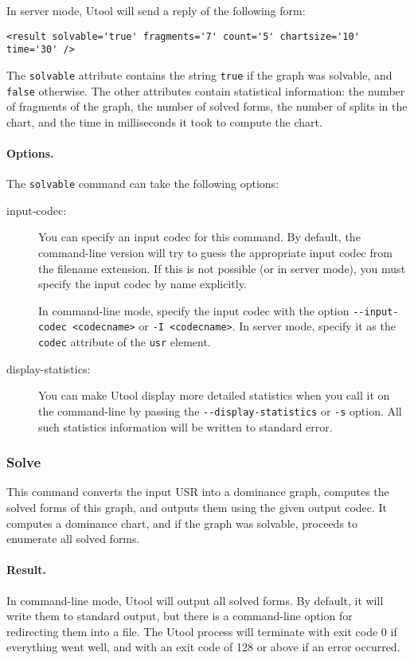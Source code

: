 In server mode, Utool will send a reply of the following form:
\begin{verbatim}
<result solvable='true' fragments='7' count='5' chartsize='10' time='30' />
\end{verbatim}

The \verb?solvable? attribute contains the string \verb?true? if the
graph was solvable, and \verb?false? otherwise. The other attributes
contain statistical information: the number of fragments of the graph,
the number of solved forms, the number of splits in the chart, and the
time in milliseconds it took to compute the chart.


\paragraph{Options.}
The \verb?solvable? command can take the following options:
\begin{description}
\item[input-codec:] You can specify an input codec for this
command. By default, the command-line version will try to guess the
appropriate input codec from the filename extension. If this is not
possible (or in server mode), you must specify the input codec by name
explicitly.

In command-line mode, specify the input codec with the option
\verb?--input-codec <codecname>? or \verb?-I <codecname>?. In server
mode, specify it as the \verb?codec? attribute of the \verb?usr?
element.
\item[display-statistics:] You can make Utool display more detailed
statistics when you call it on the command-line by passing the
\verb?--display-statistics? or \verb?-s? option. All such statistics
information will be written to standard error.
\end{description}



\subsubsection{Solve}

This command converts the input USR into a dominance graph, computes
the solved forms of this graph, and outputs them using the given
output codec. It computes a dominance chart, and if the graph was
solvable, proceeds to enumerate all solved forms.


\paragraph{Result.}
In command-line mode, Utool will output all solved forms. By default,
it will write them to standard output, but there is a command-line
option for redirecting them into a file. The Utool process will
terminate with exit code 0 if everything went well, and with an exit
code of 128 or above if an error occurred.

